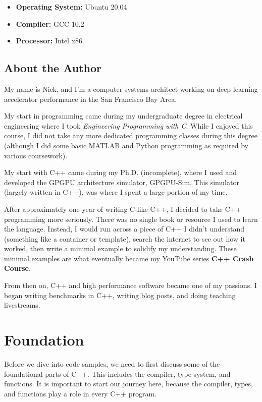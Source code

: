 \documentclass[11pt,fancy,authoryear]{elegantbook}
\begin{document}
\begin{itemize}
  \item \textbf{Operating System: } Ubuntu 20.04
  \item \textbf{Compiler: } GCC 10.2
  \item \textbf{Processor: } Intel x86
\end{itemize}

\section{About the Author}

My name is Nick, and I'm a computer systems architect working on deep learning accelerator performance in the San Francisco Bay Area.

My start in programming came during my undergraduate degree in electrical engineering where I took \textit{Engineering Programming with C}. While I enjoyed this course, I did not take any more dedicated programming classes during this degree (although I did some basic MATLAB and Python programming as required by various coursework).

My start with C++ came during my Ph.D. (incomplete), where I used and developed the GPGPU architecture simulator, GPGPU-Sim. This simulator (largely written in C++), was where I spent a large portion of my time.

After approximately one year of writing C-like C++, I decided to take C++ programming more seriously. There was no single book or resource I used to learn the language. Instead, I would run across a piece of C++ I didn't understand (something like a container or template), search the internet to see out how it worked, then write a minimal example to solidify my understanding. These minimal examples are what eventually became my YouTube series \textbf{C++ Crash Course}.

From then on, C++ and high performance software became one of my passions. I began writing benchmarks in C++, writing blog posts, and doing teaching livestreams.

\chapter{Foundation}

Before we dive into code samples, we need to first discuss some of the foundational parts of C++. This includes the compiler, type system, and functions. It is important to start our journey here, because the compiler, types, and functions play a role in every C++ program.
\end{document}
